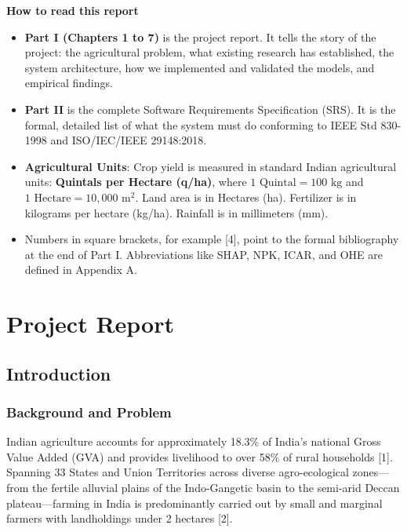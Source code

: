 \documentclass[11pt,a4paper]{report}
\begin{document}
\vspace{10mm}
\noindent
\textbf{\large How to read this report}
\begin{itemize}
  \item \textbf{Part I (Chapters 1 to 7)} is the project report. It tells the story of the project: the agricultural problem, what existing research has established, the system architecture, how we implemented and validated the models, and empirical findings.
  \item \textbf{Part II} is the complete Software Requirements Specification (SRS). It is the formal, detailed list of what the system must do conforming to IEEE Std 830-1998 and ISO/IEC/IEEE 29148:2018.
  \item \textbf{Agricultural Units}: Crop yield is measured in standard Indian agricultural units: \textbf{Quintals per Hectare (q/ha)}, where $1\text{ Quintal} = 100\text{ kg}$ and $1\text{ Hectare} = 10,000\text{ m}^2$. Land area is in Hectares (ha). Fertilizer is in kilograms per hectare (kg/ha). Rainfall is in millimeters (mm).
  \item Numbers in square brackets, for example [4], point to the formal bibliography at the end of Part I. Abbreviations like SHAP, NPK, ICAR, and OHE are defined in Appendix A.
\end{itemize}

\newpage

\tableofcontents
\newpage
\listoffigures
\newpage
\listoftables
\newpage

\setcounter{page}{1}

\part{Project Report}

\chapter{Introduction}

\section{Background and Problem}
Indian agriculture accounts for approximately 18.3\% of India's national Gross Value Added (GVA) and provides livelihood to over 58\% of rural households [1]. Spanning 33 States and Union Territories across diverse agro-ecological zones---from the fertile alluvial plains of the Indo-Gangetic basin to the semi-arid Deccan plateau---farming in India is predominantly carried out by small and marginal farmers with landholdings under 2 hectares [2].
\end{document}
